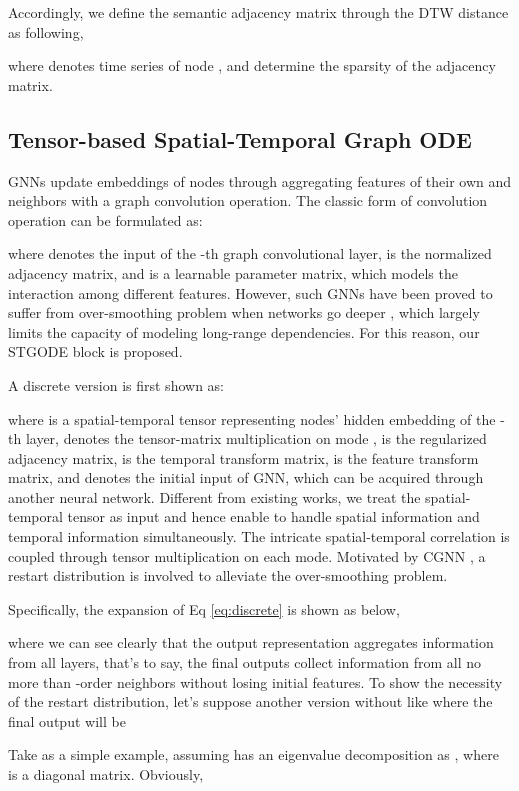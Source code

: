 \documentclass[sigconf]{acmart}
\theoremstyle{definition}
\begin{document}
Accordingly, we define the semantic adjacency matrix through the DTW distance as following,

where  denotes time series of node , and  determine the sparsity of the adjacency matrix.

\subsection{Tensor-based Spatial-Temporal Graph ODE}
GNNs update embeddings of nodes through aggregating features of their own and neighbors with a graph convolution operation. The classic form of convolution operation can be formulated as:

where  denotes the input of the -th graph convolutional layer,  is the normalized adjacency matrix, and  is a learnable parameter matrix, which models the interaction among different features. However, such GNNs have been proved to suffer from over-smoothing problem when networks go deeper \cite{zhou2018graph, li2018deeper}, which largely limits the capacity of modeling long-range dependencies. For this reason, our STGODE block is proposed.

A discrete version is first shown as:

where  is a spatial-temporal tensor representing nodes' hidden embedding of the -th layer,  denotes the tensor-matrix multiplication on mode ,  is the regularized adjacency matrix,  is the temporal transform matrix,  is the feature transform matrix, and  denotes the initial input of GNN, which can be acquired through another neural network. Different from existing works, we treat the spatial-temporal tensor as input and hence enable to handle spatial information and temporal information simultaneously. The intricate spatial-temporal correlation is coupled through tensor multiplication on each mode. Motivated by CGNN \cite{xhonneux2020continuous}, a restart distribution  is involved to alleviate the over-smoothing problem.

Specifically, the expansion of Eq \ref{eq:discrete} is shown as below,

where we can see clearly that the output representation  aggregates information from all layers, that's to say, the final outputs collect information from all no more than -order neighbors without losing initial features. To show the necessity of the restart distribution, let's suppose another version without  like 
where the final output will be

Take  as a simple example, assuming  has an eigenvalue decomposition as , where  is a diagonal matrix. Obviously,
\end{document}
